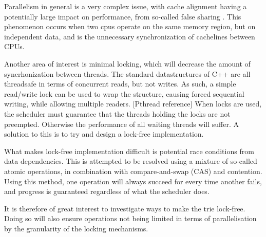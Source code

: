 Parallelism in general is a very complex issue, with cache alignment having a
potentially large impact on performance, from so-called false sharing
\cite{Shavit:2011}. This phenomenon occurs when two cpus operate on the same
memory region, but on independent data, and is the unnecessary synchronization
of cachelines between CPUs.

Another area of interest is minimal locking, which will decrease the amount of
syncrhonization between threads. The standard datastructures of C++ are all
threadsafe in terms of concurrent reads, but not writes. As such, a simple
read/write lock can be used to wrap the structure, causing forced sequential
writing, while allowing multiple readers. [Pthread reference] When locks are
used, the scheduler must guarantee that the threads holding the locks are not
preempted. Otherwise the performance of all waiting threads will suffer. A
solution to this is to try and design a lock-free implementation.

What makes lock-free implementation difficult is potential race conditions from
data dependencies. This is attempted to be resolved using a
mixture of so-called atomic operations, in combination with compare-and-swap
(CAS) and contention. Using this method, one operation will always succeed for
every time another fails, and progress is guaranteed regardless of what the
scheduler does\cite{Shavit:2011}.

It is therefore of great interest to investigate ways to make the trie lock-free.
Doing so will also ensure operations not being limited in terms of parallelisation
by the granularity of the locking mechanisms.
